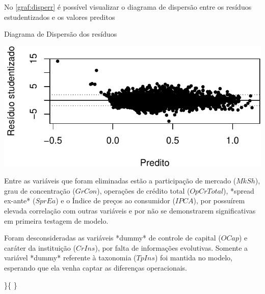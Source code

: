 \documentclass[
  12pt,
  12pt,
  openright,
  oneside,
  a4paper,
  chapter=TITLE,
  section=TITLE,
  subsection=TITLE,
  subsubsection=TITLE,
  portugues,
  sumario=tradicional]{abntex2}
\begin{document}
\begin{apendicesenv}
No \autoref{graf:disperr} é possível visualizar o diagrama de dispersão entre os resíduos estudentizados e os valores preditos




\begin{grafico}[!hbtp]
\caption{Diagrama de Dispersão dos resíduos}
\vspace{-4mm}

\begin{center}\includegraphics{12-exportedfigures/erros.disp-1} \end{center}
\vspace{3mm}
\label{graf:disperr}
\vspace{-2mm}
\end{grafico}











Entre as variáveis que foram eliminadas estão a participação de mercado ($MkSh$), grau de concentração ($GrCon$), operações de crédito total ($OpCrTotal$), *spread ex-ante* ($SprEa$) e o Índice de preços ao consumidor ($IPCA$), por possuírem elevada correlação com outras variáveis e por não se demonstrarem significativas em primeira testagem de modelo. 

Foram desconsideradas as variáveis *dummy* de controle de capital ($OCap$) e caráter da instituição ($CrIns$), por falta de informações evolutivas. Somente a variável *dummy*  referente à taxonomia ($TpIns$) foi mantida no modelo, esperando que ela venha captar as diferenças operacionais.



\end{apendicesenv}

\}\{
\}



\printbibliography
\end{document}
